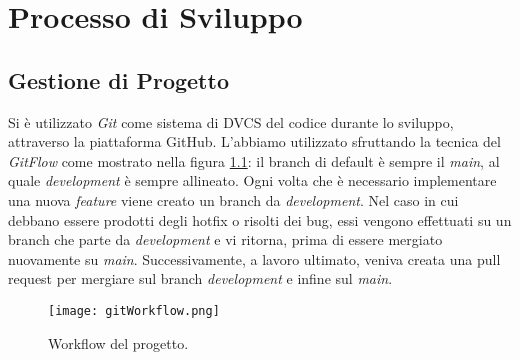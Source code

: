 \chapter{Processo di Sviluppo}

\section{Gestione di Progetto}
Si è utilizzato \textit{Git} come sistema di DVCS del codice durante lo sviluppo, attraverso la piattaforma GitHub. L'abbiamo utilizzato sfruttando la tecnica del \textit{GitFlow} come mostrato nella figura \ref{pic:workflow}: il branch di default è sempre il \textit{main}, al quale \textit{development} è sempre allineato. Ogni volta che è necessario implementare una nuova \textit{feature} viene creato un branch da \textit{development}. Nel caso in cui debbano essere prodotti degli hotfix o risolti dei bug, essi vengono effettuati su un branch che parte da \textit{development} e vi ritorna, prima di essere mergiato nuovamente su \textit{main}. Successivamente, a lavoro ultimato, veniva creata una pull request per mergiare sul branch \textit{development} e infine sul \textit{main}.

\begin{figure}[ht]
    \texttt{[image: gitWorkflow.png]}
    \centering
    \caption{\label{pic:workflow}Workflow del progetto.}
\end{figure}

